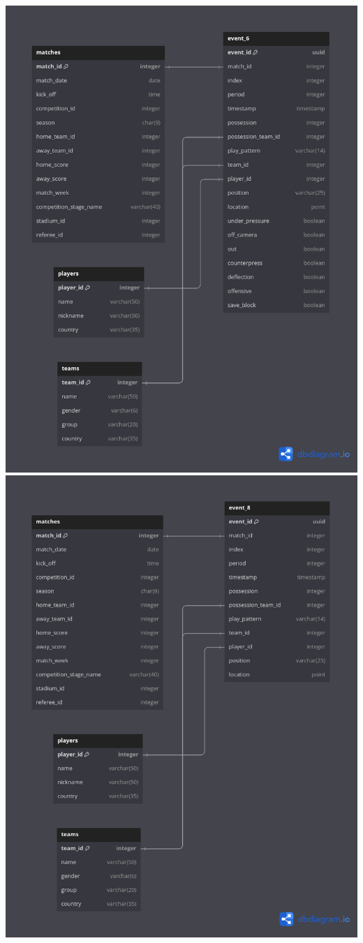 \documentclass[12pt]{article}
\begin{document}
\includegraphics[width=\textwidth]{schema-diagram/event_6.png}
\includegraphics[width=\textwidth]{schema-diagram/event_8.png}
\end{document}
